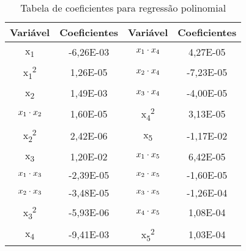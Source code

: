 \begin{table}[]
\centering
\caption{Tabela de coeficientes para regressão polinomial}
\label{tab:coeficiente_poli}
\begin{tabular}{|c|c|c|c|}
\hline
\multicolumn{1}{|l|}{Variável} & \multicolumn{1}{l|}{Coeficientes} & \multicolumn{1}{l|}{Variável} & \multicolumn{1}{l|}{Coeficientes} \\ \hline
x\textsubscript{1}                             & -6,26E-03                        & $x\textsubscript{1} \cdot x\textsubscript{4}$                         & 4,27E-05                         \\ \hline
x\textsubscript{1}\textsuperscript{2}                            & 1,26E-05                         & $x\textsubscript{2} \cdot x\textsubscript{4}$                       & -7,23E-05                        \\ \hline
x\textsubscript{2}                             & 1,49E-03                         & $x\textsubscript{3} \cdot x\textsubscript{4}$                                                & -4,00E-05                        \\ \hline
$x\textsubscript{1} \cdot x\textsubscript{2}$                          & 1,60E-05                         & x\textsubscript{4}\textsuperscript{2}                           & 3,13E-05                         \\ \hline
x\textsubscript{2}\textsuperscript{2}                            & 2,42E-06                         & x\textsubscript{5}                            & -1,17E-02                        \\ \hline
x\textsubscript{3}                             & 1,20E-02                         & $x\textsubscript{1} \cdot x\textsubscript{5}$                                                                       & 6,42E-05                         \\ \hline
$x\textsubscript{1} \cdot x\textsubscript{3}$                        & -2,39E-05                        & $x\textsubscript{2} \cdot x\textsubscript{5}$                                                                       & -1,60E-05                        \\ \hline
$x\textsubscript{2} \cdot x\textsubscript{3}$                          & -3,48E-05                        & $x\textsubscript{3} \cdot x\textsubscript{5}$                                                                       & -1,26E-04                        \\ \hline
x\textsubscript{3}\textsuperscript{2}                            & -5,93E-06                        &$ x\textsubscript{4} \cdot x\textsubscript{5}$                                                                       & 1,08E-04                         \\ \hline
x\textsubscript{4}                             & -9,41E-03                        & x\textsubscript{5}\textsuperscript{2}                         & 1,03E-04                         \\ \hline
\end{tabular}
\end{table}

